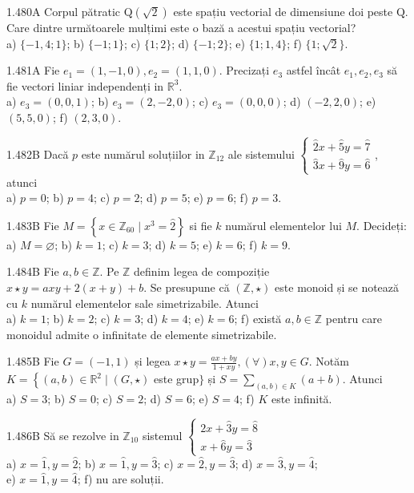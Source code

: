 \documentclass[11pt]{article}
\begin{document}
1.480A Corpul pătratic $\mathrm{Q}(\sqrt{2})$ este spațiu vectorial de dimensiune doi peste $\mathrm{Q}$. Care dintre următoarele mulțimi este o bază a acestui spațiu vectorial?\\ a) $\{-1,4; 1\}$; b) $\{-1; 1\}$; c) $\{1 ; 2\}$; d) $\{-1; 2\}$; e) $\{1; 1,4\}$; f) $\{1; \sqrt{2}\}$.

1.481A Fie $e_{1}=(1,-1,0), e_{2}=(1,1,0)$. Precizați $e_{3}$ astfel încât $e_{1}, e_{2}, e_{3}$ să fie vectori liniar independenți in $\mathbb{R}^{3}$.\\ a) $e_{3}=(0,0,1)$; b) $e_{3}=(2,-2,0)$; c) $e_{3}=(0,0,0)$; d) $(-2,2,0)$; e) $(5,5,0)$; f) $(2,3,0)$.
 
1.482B Dacă $p$ este numărul soluțiilor in $\mathbb{Z}_{12}$ ale sistemului $\left\{\begin{array}{l}\hat{2} x+\hat{5} y=\hat{7} \\ \hat{3} x+\hat{9} y=\hat{6}\end{array}\right.$,\\atunci\\ a) $p=0$; b) $p=4$; c) $p=2$; d) $p=5$; e) $p=6$; f) $p=3$.

1.483B Fie $M=\left\{x \in \mathbb{Z}_{60} \mid x^{3}=\hat{2}\right\}$ si fie $k$ numărul elementelor lui $M$. Decideți:\\ a) $M=\varnothing$; b) $k=1$; c) $k=3$; d) $k=5$; e) $k=6$; f) $k=9$.

1.484B Fie $a, b \in \mathbb{Z}$. Pe $\mathbb{Z}$ definim legea de compoziție $x \star y=a x y+2(x+y)+b$. Se presupune că $(\mathbb{Z}, \star)$ este monoid și se notează cu $k$ numărul elementelor sale simetrizabile. Atunci\\ a) $k=1$; b) $k=2$; c) $k=3$; d) $k=4$; e) $k=6$; f) există $a, b \in \mathbb{Z}$ pentru care monoidul admite o infinitate de elemente simetrizabile.

1.485B Fie $G=(-1,1)$ și legea $x \star y=\frac{a x+b y}{1+x y},(\forall) x, y \in G$. Notăm $K=\left\{(a, b) \in \mathbb{R}^{2} \mid(G, \star)\right.$ este grup$\}$ și $S=\sum_{(a, b) \in K}(a+b)$. Atunci\\ a) $S=3$; b) $S=0$; c) $S=2$; d) $S=6$; e) $S=4$; f) $K$ este infinită.

1.486B Să se rezolve in $\mathbb{Z}_{10}$ sistemul $\left\{\begin{array}{l}2 x+\hat{3} y=\hat{8} \\ x+\hat{6} y=\hat{3}\end{array}\right.$\\ a) $x=\hat{1}, y=\hat{2}$; b) $x=\hat{1}, y=\hat{3}$; c) $x=\hat{2}, y=\hat{3}$; d) $x=\hat{3}, y=\hat{4}$;\\ e) $x=\hat{1}, y=\hat{4}$; f) nu are soluții.
\end{document}
